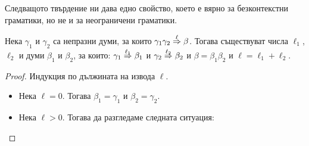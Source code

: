 Следващото твърдение ни дава едно свойство, което е вярно за безконтекстни граматики, но не и за неограничени граматики.
\begin{proposition}\label{pr:grammar:divide-2}
  Нека $\gamma_1$ и $\gamma_2$ са непразни думи, за които $\gamma_1\gamma_2 \derive{\ell} \beta$. Тогава
  съществуват числа $\ell_1$, $\ell_2$ и думи $\beta_1$ и $\beta_2$, за които:
  $\gamma_1 \derive{\ell_1} \beta_1$ и $\gamma_2 \derive{\ell_2} \beta_2$ и $\beta = \beta_1\beta_2$ и $\ell = \ell_1 + \ell_2$.
\end{proposition}
\begin{proof}  
Индукция по дължината на извода $\ell$.
\begin{itemize}
\item
  Нека $\ell = 0$. Тогава $\beta_1 = \gamma_1$ и $\beta_2 = \gamma_2$.
\item
  Нека $\ell > 0$. Тогава да разгледаме следната ситуация:
  \begin{prooftree}
  \end{prooftree}


\end{itemize}
\end{proof}
